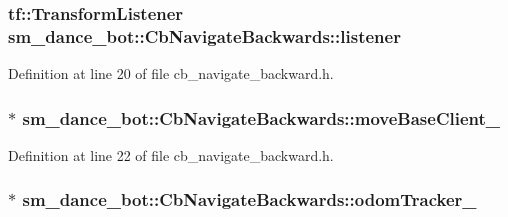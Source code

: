 \subsubsection[{\texorpdfstring{listener}{listener}}]{\setlength{\rightskip}{0pt plus 5cm}tf\+::\+Transform\+Listener sm\+\_\+dance\+\_\+bot\+::\+Cb\+Navigate\+Backwards\+::listener}\hypertarget{classsm__dance__bot_1_1CbNavigateBackwards_a4ec9af0d5b94c5e0654a768c36bec85b}{}\label{classsm__dance__bot_1_1CbNavigateBackwards_a4ec9af0d5b94c5e0654a768c36bec85b}


Definition at line 20 of file cb\+\_\+navigate\+\_\+backward.\+h.

\subsubsection[{\texorpdfstring{move\+Base\+Client\+\_\+}{moveBaseClient_}}]{ $\ast$ sm\+\_\+dance\+\_\+bot\+::\+Cb\+Navigate\+Backwards\+::move\+Base\+Client\+\_\+}\hypertarget{classsm__dance__bot_1_1CbNavigateBackwards_ae4cd503172b4f5c7b0dba49aec08885e}{}\label{classsm__dance__bot_1_1CbNavigateBackwards_ae4cd503172b4f5c7b0dba49aec08885e}


Definition at line 22 of file cb\+\_\+navigate\+\_\+backward.\+h.

\subsubsection[{\texorpdfstring{odom\+Tracker\+\_\+}{odomTracker_}}]{ $\ast$ sm\+\_\+dance\+\_\+bot\+::\+Cb\+Navigate\+Backwards\+::odom\+Tracker\+\_\+}\hypertarget{classsm__dance__bot_1_1CbNavigateBackwards_ad3e1305c551fe5dcbfb92b1e080f382d}{}\label{classsm__dance__bot_1_1CbNavigateBackwards_ad3e1305c551fe5dcbfb92b1e080f382d}


